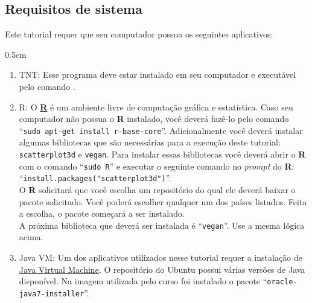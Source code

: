 \newpage
\pagestyle{fancy} %
\begin{refsection}
\renewcommand*{\finalnamedelim}{\addspace\&\space}%


\section{Requisitos de sistema}\label{tut3:require}
Este tutorial requer que seu computador possua os seguintes aplicativos:

\begin {myindentpar}{0.5cm}
\begin{enumerate}[\itshape i.]
	\item{TNT:}\label{tut3:require:tnt} Esse programa  \parencite{GoloboffETAL2008} deve estar instalado em seu computador e executável pelo comando .

	\item{R:}\label{tut3:require:R} O \textbf{\href{http://www.r-project.org/}{R}} é um ambiente livre de computação gráfica e estatística. Caso seu computador não possua o \textbf{R} instalado, você deverá fazê-lo pelo comando ``\texttt{sudo apt-get install r-base-core}''. Adicionalmente você deverá instalar algumas bibliotecas que são necessárias para a execução deste tutorial: \texttt{scatterplot3d} e \texttt{vegan}. Para instalar essas bibliotecas você deverá abrir o \textbf{R} com o comando ``\texttt{sudo R}'' e executar o seguinte comando no \textit{prompt} do \textbf{R}: ``\texttt{install.packages("scatterplot3d")}''.\\
	O \textbf{R} solicitará que você escolha um repositório do qual ele deverá baixar o pacote solicitado. Você poderá escolher qualquer um dos países listados. Feita a escolha, o pacote começará a ser instalado.\\
	A próxima biblioteca que deverá ser instalada é ``\texttt{vegan}''. Use a mesma lógica acima.\\

	\item{Java VM:}\label{tut3:require:Java} Um dos aplicativos utilizados nesse tutorial requer a instalação de \href{http://www.java.com/pt_BR/download/}{Java Virtual Machine}. O repositório do Ubuntu possui várias versões de Java disponível. Na imagem utilizada pelo curso foi instalado o pacote ``\texttt{oracle-java7-installer}''.\\


\end{enumerate}
\end{myindentpar}
\end{refsection}
